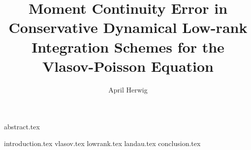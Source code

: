\documentclass[a4paper]{article}
\title{
    Moment Continuity Error in Conservative 
    Dynamical Low-rank Integration Schemes 
    for the Vlasov-Poisson Equation
}
\author{April Herwig}
\begin{document}
\maketitle

{abstract.tex}

\tableofcontents

{introduction.tex}
{vlasov.tex}
{lowrank.tex}
{landau.tex}
{conclusion.tex}

\printbibliography
\end{document}
